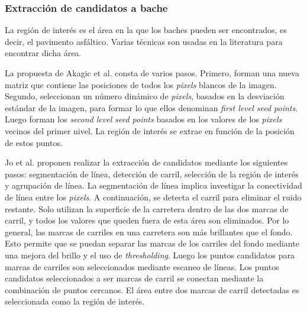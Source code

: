 		\subsubsection{Extracción de candidatos a bache}
		La región de interés es el área en la que los baches pueden ser encontrados, es decir, el pavimento asfáltico.
		Varias técnicas son usadas en la literatura para encontrar dicha área. 

		La propuesta de Akagic et al. consta de varios pasos. Primero, forman una nueva matriz que contiene las posiciones 
		de todos los \emph{pixels} blancos de la imagen. Segundo, seleccionan un número dinámico de \emph{pixels}, basados 
		en la desviación estándar de la imagen, para formar lo que ellos denominan \emph{first level seed points}. Luego forman  los 
		\emph{second level seed points} basados en los valores de los \emph{pixels} vecinos del primer nivel. La región de
		interés se extrae en función de la posición de estos puntos.
		

		Jo et al. proponen realizar la extracción de candidatos mediante los siguientes pasos: segmentación de línea, 
		detección de carril, selección de la región de interés y agrupación de línea. La segmentación de línea implica investigar la conectividad 
		de línea entre los \emph{pixels}. A continuación, se detecta el carril para eliminar el ruido restante. Solo utilizan la superficie de la 
		carretera dentro de las dos marcas de carril, y todos los valores que queden fuera de esta área son eliminados. Por lo general, las marcas 
		de carriles en una carretera son más brillantes que el fondo. Esto permite que  se puedan separar las marcas de los carriles del fondo mediante 
		una  mejora del brillo y el uso de \emph{thresholding}. Luego los puntos candidatos para marcas de carriles son seleccionados mediante escaneo de 
		líneas. Los puntos candidatos seleccionados a ser marcas de carril se conectan mediante la combinación de puntos cercanos. El área entre 
		dos marcas de carril detectadas es seleccionada como la región de interés. 


